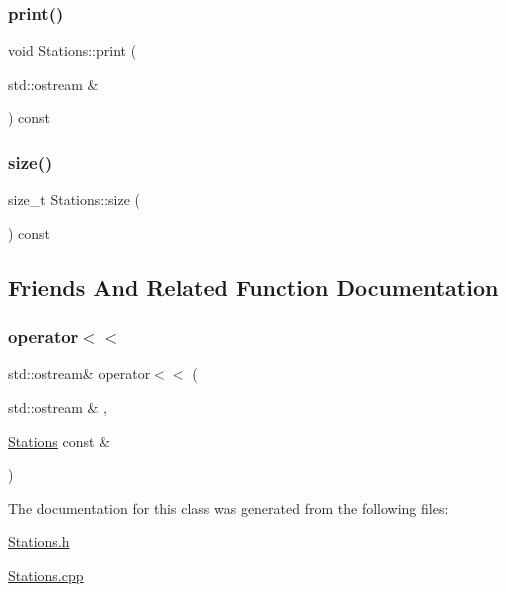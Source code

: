 \subsubsection{\texorpdfstring{print()}{print()}}
{\footnotesize\ttfamily void Stations\+::print (\begin{DoxyParamCaption}\item[{std\+::ostream \&}]{ }\end{DoxyParamCaption}) const}

\mbox{\label{class_stations_ab6e3d3635fffe60f813b1fa7c28e4d8c}} 
\subsubsection{\texorpdfstring{size()}{size()}}
{\footnotesize\ttfamily size\+\_\+t Stations\+::size (\begin{DoxyParamCaption}{ }\end{DoxyParamCaption}) const}



\subsection{Friends And Related Function Documentation}
\mbox{\label{class_stations_a6c2ba44849c083fa6d206d4573ea523e}} 
\subsubsection{\texorpdfstring{operator$<$$<$}{operator<<}}
{\footnotesize\ttfamily std\+::ostream\& operator$<$$<$ (\begin{DoxyParamCaption}\item[{std\+::ostream \&}]{,  }\item[{\mbox{\hyperlink{class_stations}{Stations}} const \&}]{ }\end{DoxyParamCaption})\hspace{0.3cm}{\ttfamily [friend]}}



The documentation for this class was generated from the following files\+:\begin{DoxyCompactItemize}
\item 
\mbox{\hyperlink{_stations_8h}{Stations.\+h}}\item 
\mbox{\hyperlink{_stations_8cpp}{Stations.\+cpp}}\end{DoxyCompactItemize}
